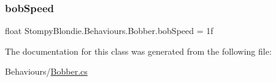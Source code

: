\mbox{\label{class_stompy_blondie_1_1_behaviours_1_1_bobber_a70dd7d7f45370459a859ee2c86d5cf9f}} 
\subsubsection{\texorpdfstring{bob\+Speed}{bobSpeed}}
{\footnotesize\ttfamily float Stompy\+Blondie.\+Behaviours.\+Bobber.\+bob\+Speed = 1f}



The documentation for this class was generated from the following file\+:\begin{DoxyCompactItemize}
\item 
Behaviours/\mbox{\hyperlink{_bobber_8cs}{Bobber.\+cs}}\end{DoxyCompactItemize}
